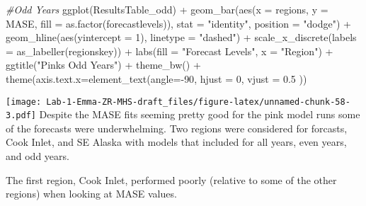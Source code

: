 \documentclass[
]{article}
\newenvironment{Shaded}{\begin{snugshade}}{\end{snugshade}}
\newcommand{\AttributeTok}[1]{\textcolor[rgb]{0.77,0.63,0.00}{#1}}
\newcommand{\CommentTok}[1]{\textcolor[rgb]{0.56,0.35,0.01}{\textit{#1}}}
\newcommand{\DecValTok}[1]{\textcolor[rgb]{0.00,0.00,0.81}{#1}}
\newcommand{\FloatTok}[1]{\textcolor[rgb]{0.00,0.00,0.81}{#1}}
\newcommand{\FunctionTok}[1]{\textcolor[rgb]{0.00,0.00,0.00}{#1}}
\newcommand{\NormalTok}[1]{#1}
\newcommand{\SpecialCharTok}[1]{\textcolor[rgb]{0.00,0.00,0.00}{#1}}
\newcommand{\StringTok}[1]{\textcolor[rgb]{0.31,0.60,0.02}{#1}}
\begin{document}
\begin{Shaded}
\begin{Highlighting}[]
\CommentTok{\#Odd Years }
\FunctionTok{ggplot}\NormalTok{(ResultsTable\_odd) }\SpecialCharTok{+} 
  \FunctionTok{geom\_bar}\NormalTok{(}\FunctionTok{aes}\NormalTok{(}\AttributeTok{x =}\NormalTok{ regions, }\AttributeTok{y =}\NormalTok{ MASE, }\AttributeTok{fill =} \FunctionTok{as.factor}\NormalTok{(forecastlevels)), }\AttributeTok{stat =} \StringTok{"identity"}\NormalTok{, }\AttributeTok{position =} \StringTok{"dodge"}\NormalTok{) }\SpecialCharTok{+} 
  \FunctionTok{geom\_hline}\NormalTok{(}\FunctionTok{aes}\NormalTok{(}\AttributeTok{yintercept =} \DecValTok{1}\NormalTok{), }\AttributeTok{linetype =} \StringTok{"dashed"}\NormalTok{) }\SpecialCharTok{+} 
  \FunctionTok{scale\_x\_discrete}\NormalTok{(}\AttributeTok{labels =} \FunctionTok{as\_labeller}\NormalTok{(regionskey)) }\SpecialCharTok{+}
  \FunctionTok{labs}\NormalTok{(}\AttributeTok{fill =} \StringTok{"Forecast Levels"}\NormalTok{, }\AttributeTok{x =} \StringTok{"Region"}\NormalTok{) }\SpecialCharTok{+} 
  \FunctionTok{ggtitle}\NormalTok{(}\StringTok{"Pinks Odd Years"}\NormalTok{) }\SpecialCharTok{+} \FunctionTok{theme\_bw}\NormalTok{() }\SpecialCharTok{+} \FunctionTok{theme}\NormalTok{(}\AttributeTok{axis.text.x=}\FunctionTok{element\_text}\NormalTok{(}\AttributeTok{angle=}\SpecialCharTok{{-}}\DecValTok{90}\NormalTok{, }\AttributeTok{hjust =} \DecValTok{0}\NormalTok{, }\AttributeTok{vjust =} \FloatTok{0.5}\NormalTok{ ))}
\end{Highlighting}
\end{Shaded}

\texttt{[image: Lab-1-Emma-ZR-MHS-draft\_files/figure-latex/unnamed-chunk-58-3.pdf]}
Despite the MASE fits seeming pretty good for the pink model runs some
of the forecasts were underwhelming. Two regions were considered for
forcasts, Cook Inlet, and SE Alaska with models that included for all
years, even years, and odd years.

The first region, Cook Inlet, performed poorly (relative to some of the
other regions) when looking at MASE values.
\end{document}
